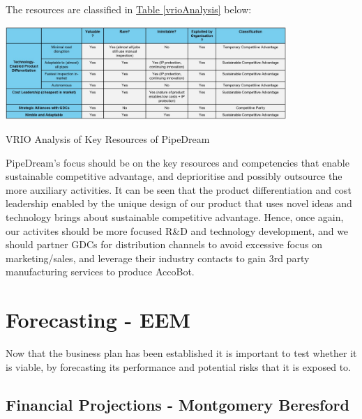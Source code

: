 \documentclass[11pt]{article}		%
\newcommand{\tableref}[1]{\hyperref[#1]{Table \ref*{#1}}}     %
\begin{document}
    The resources are classified in \tableref{vrioAnalysis} below: 
                \begin{table}[H]
					\centering
					\includegraphics[width=0.8\textwidth]{VRIO.jpg}
					\caption{VRIO Analysis of Key Resources of PipeDream}
					\label{vrioAnalysis}
			    \end{table}
			    \vspace{-0.5cm}
	PipeDream's focus should be on the key resources and competencies that enable sustainable competitive advantage, and deprioritise and possibly outsource the more auxiliary activities. It can be seen that the product differentiation and cost leadership enabled by the unique design of our product that uses novel ideas and technology brings about sustainable competitive advantage. Hence, once again, our activites should be more focused R\&D and technology development, and we should partner GDCs for distribution channels to avoid excessive focus on marketing/sales, and leverage their industry contacts to gain 3rd party manufacturing services to produce AccoBot. 
     	
 	\section{Forecasting - EEM}
 	
 	Now that the business plan has been established it is important to test whether it is viable, by forecasting its performance and potential risks that it is exposed to.
 	\label{forecasting}
 
 
        

	        \subsection[Financial Projections]{Financial Projections - Montgomery Beresford}
		        	        \label{financialModels}
\end{document}
